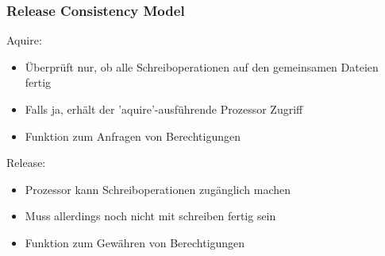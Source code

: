 \documentclass{sikslides}
\begin{document}
\begin{frame}
	\frametitle{Release Consistency Model}
Aquire:
	\begin{itemize}

		\item Überprüft nur, ob alle Schreiboperationen auf den gemeinsamen Dateien fertig
		\item Falls ja, erhält der 'aquire'-ausführende Prozessor Zugriff
		\item Funktion zum Anfragen von Berechtigungen
\bigskip
	\end{itemize}
Release:
\begin{itemize}

		\item Prozessor kann Schreiboperationen zugänglich machen
		\item Muss allerdings noch nicht mit schreiben fertig sein
		\item Funktion zum Gewähren von Berechtigungen

	\end{itemize}
\end{frame}
\end{document}
